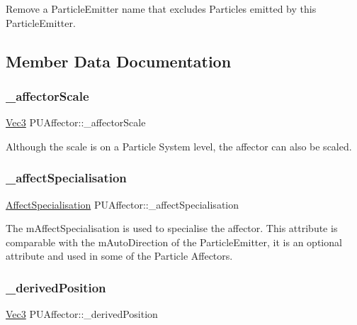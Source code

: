 Remove a Particle\+Emitter name that excludes Particles emitted by this Particle\+Emitter. 

\subsection{Member Data Documentation}
\mbox{\label{classPUAffector_adfb1e84966fd8173e66499f99cc6c651}} 
\subsubsection{\texorpdfstring{\+\_\+affector\+Scale}{\_affectorScale}}
{\footnotesize\ttfamily \hyperlink{classVec3}{Vec3} P\+U\+Affector\+::\+\_\+affector\+Scale\hspace{0.3cm}{\ttfamily [protected]}}

Although the scale is on a Particle System level, the affector can also be scaled. \mbox{\label{classPUAffector_a961e5931c0c5ad24fed34689fa9fb52d}} 
\subsubsection{\texorpdfstring{\+\_\+affect\+Specialisation}{\_affectSpecialisation}}
{\footnotesize\ttfamily \hyperlink{classPUAffector_aa4e8045ac29ee020895fd3e386935013}{Affect\+Specialisation} P\+U\+Affector\+::\+\_\+affect\+Specialisation\hspace{0.3cm}{\ttfamily [protected]}}

The m\+Affect\+Specialisation is used to specialise the affector. This attribute is comparable with the m\+Auto\+Direction of the Particle\+Emitter, it is an optional attribute and used in some of the Particle Affectors. \mbox{\label{classPUAffector_acae485bb9e267d56c2ea498675c93651}} 
\subsubsection{\texorpdfstring{\+\_\+derived\+Position}{\_derivedPosition}}
{\footnotesize\ttfamily \hyperlink{classVec3}{Vec3} P\+U\+Affector\+::\+\_\+derived\+Position\hspace{0.3cm}{\ttfamily [protected]}}

